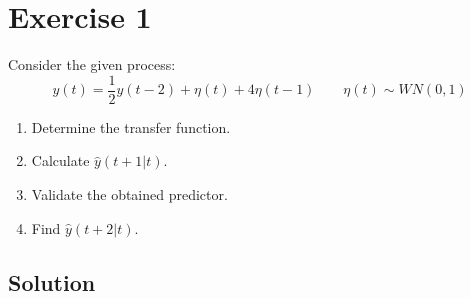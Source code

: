 \section{Exercise 1}

Consider the given process:
\[y(t)=\dfrac{1}{2}y(t-2)+\eta(t)+4\eta(t-1)\qquad \eta(t)\sim WN(0,1)\]
\begin{enumerate}
    \item Determine the transfer function.
    \item Calculate $\hat{y}(t+1|t)$.
    \item Validate the obtained predictor.
    \item Find $\hat{y}(t+2|t)$.
\end{enumerate}

\subsection*{Solution}
